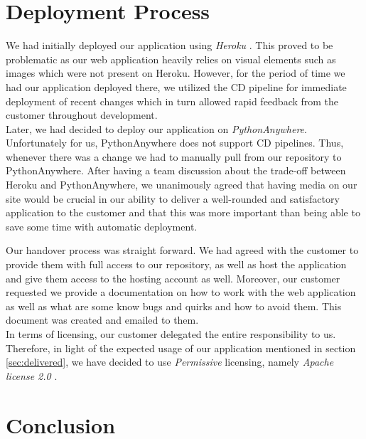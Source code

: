 \documentclass{l3proj}
\begin{document}


\section{Deployment Process}
\label{sec:deployment}
    We had initially deployed our application using \textit{Heroku} \cite{heroku}. This proved to be problematic as our web application heavily relies on visual elements such as images which were not present on Heroku. However, for the period of time we had our application deployed there, we utilized the CD pipeline for immediate deployment of recent changes which in turn allowed rapid feedback from the customer throughout development.\\
    Later, we had decided to deploy our application on \textit{PythonAnywhere}\cite{pythonanywhere}. Unfortunately for us, PythonAnywhere does not support CD pipelines. Thus, whenever there was a change we had to manually pull from our repository to PythonAnywhere. After having a team discussion about the trade-off between Heroku and PythonAnywhere, we unanimously agreed that having media on our site would be crucial in our ability to deliver a well-rounded and satisfactory application to the customer and that this was more important than being able to save some time with automatic deployment.
    
    Our handover process was straight forward. We had agreed with the customer to provide them with full access to our repository, as well as host the application and give them access to the hosting account as well. Moreover, our customer requested we provide a documentation on how to work with the web application as well as what are some know bugs and quirks and how to avoid them. This document was created and emailed to them.\\
    In terms of licensing, our customer delegated the entire responsibility to us. Therefore, in light of the expected usage of our application mentioned in section \ref{sec:delivered}, we have decided to use \textit{Permissive} \cite{permissive} licensing, namely \textit{Apache license 2.0} \cite{apache}.
    

\section{Conclusion}
\end{document}
